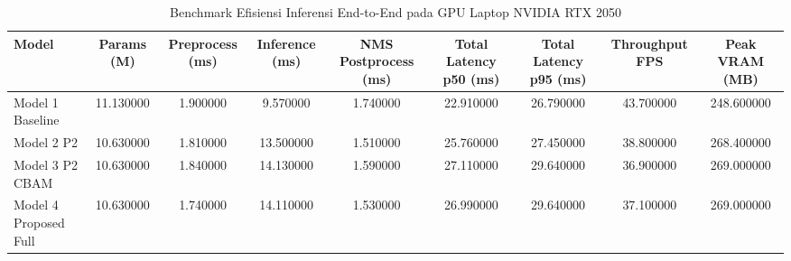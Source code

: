 \begin{table}[htbp]
\caption{Benchmark Efisiensi Inferensi End-to-End pada GPU Laptop NVIDIA RTX 2050}
\label{tab:hardware_efficiency}
\begin{tabular}{lcccccccc}
\toprule
Model & Params (M) & Preprocess (ms) & Inference (ms) & NMS Postprocess (ms) & Total Latency p50 (ms) & Total Latency p95 (ms) & Throughput FPS & Peak VRAM (MB) \\
\midrule
Model 1 Baseline & 11.130000 & 1.900000 & 9.570000 & 1.740000 & 22.910000 & 26.790000 & 43.700000 & 248.600000 \\
Model 2 P2 & 10.630000 & 1.810000 & 13.500000 & 1.510000 & 25.760000 & 27.450000 & 38.800000 & 268.400000 \\
Model 3 P2 CBAM & 10.630000 & 1.840000 & 14.130000 & 1.590000 & 27.110000 & 29.640000 & 36.900000 & 269.000000 \\
Model 4 Proposed Full & 10.630000 & 1.740000 & 14.110000 & 1.530000 & 26.990000 & 29.640000 & 37.100000 & 269.000000 \\
\bottomrule
\end{tabular}
\end{table}
